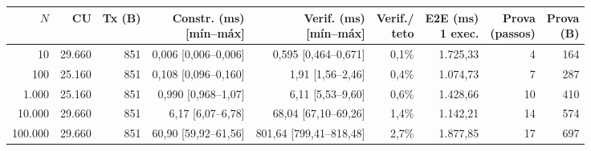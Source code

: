 \begin{tabular}{r r r r r r r r r}
\toprule
$N$ & CU & Tx (B) & \makecell{Constr. (ms)\\ {[mín--máx]}} & \makecell{Verif. (ms)\\ {[mín--máx]}} & \makecell{Verif./\\teto} & \makecell{E2E (ms)\\ 1 exec.} & \makecell{Prova\\ (passos)} & \makecell{Prova\\ (B)} \\
\midrule
10 & 29.660 & 851 & 0,006 [0,006--0,006] & 0,595 [0,464--0,671] & 0,1\% & 1.725,33 & 4 & 164 \\
100 & 25.160 & 851 & 0,108 [0,096--0,160] & 1,91 [1,56--2,46] & 0,4\% & 1.074,73 & 7 & 287 \\
1.000 & 25.160 & 851 & 0,990 [0,968--1,07] & 6,11 [5,53--9,60] & 0,6\% & 1.428,66 & 10 & 410 \\
10.000 & 29.660 & 851 & 6,17 [6,07--6,78] & 68,04 [67,10--69,26] & 1,4\% & 1.142,21 & 14 & 574 \\
100.000 & 29.660 & 851 & 60,90 [59,92--61,56] & 801,64 [799,41--818,48] & 2,7\% & 1.877,85 & 17 & 697 \\
\bottomrule
\end{tabular}
